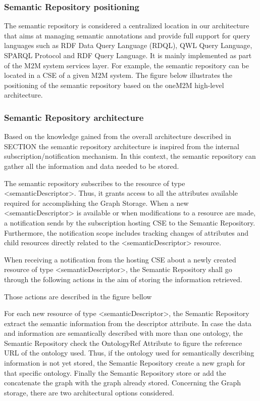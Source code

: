\subsubsection{Semantic Repository positioning}
The semantic repository is considered a centralized location in our architecture that aims at managing semantic annotations and provide full support for query languages such as RDF Data Query Language (RDQL), QWL Query Language, SPARQL Protocol and RDF Query Language. It is mainly implemented as part of the M2M system services layer. For example, the semantic repository can be located in a CSE of a given M2M system. The figure below illustrates the positioning of the semantic repository based on the oneM2M high-level architecture.
\subsubsection{Semantic Repository architecture}
Based on the knowledge gained from the overall architecture described in SECTION the semantic repository architecture is inspired from the internal subscription/notification mechanism. In this context, the semantic repository can gather all the information and data needed to be stored. \par
The semantic repository subscribes to the resource of type <semanticDescriptor>. Thus, it grants access to all the attributes available required for accomplishing the Graph Storage. When a new <semanticDescriptor> is available or when modifications to a resource are made, a notification sends by the subscription hosting CSE to the Semantic Repository. Furthermore, the notification scope includes tracking changes of attributes and child resources directly related to the <semanticDescriptor> resource. \par
When receiving a notification from the hosting CSE about a newly created resource of type <semanticDescriptor>, the Semantic Repository shall go through the following actions in the aim of storing the information retrieved. \item
Those actions are described in the figure bellow \par
For each new resource of type <semanticDescriptor>, the Semantic Repository extract the semantic information from the descriptor attribute. In case the data and information are semantically described with more than one ontology, the Semantic Repository check the OntologyRef Attribute to figure the reference URL of the ontology used. Thus, if the ontology used for semantically describing information is not yet stored, the Semantic Repository create a new graph for that specific ontology. Finally the Semantic Repository store or add the concatenate the graph with the graph already stored. Concerning the Graph storage, there are two architectural options considered.
